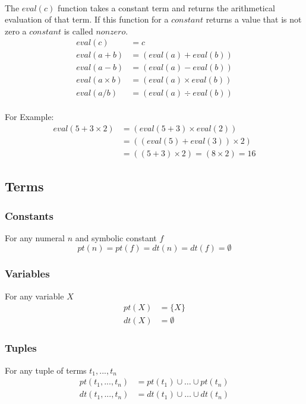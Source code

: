 \documentclass{article}
\newcommand{\set}[1]{\{#1\}}
\begin{document}
	\paragraph{}
	The $\mathit{eval(c)}$ function takes a constant term and returns the arithmetical evaluation of that term. If this function for a $\mathit{constant}$ returns a value that is not zero a $\mathit{constant}$ is called $\mathit{nonzero}$.
	\begin{align*}
		\mathit{eval(c)} &= c \\
		\mathit{eval(a + b)} &= (eval(a) + eval(b)) \\
		\mathit{eval(a - b)} &= (eval(a) - eval(b)) \\
		\mathit{eval(a \times b)} &= (eval(a) \times eval(b)) \\
		\mathit{eval(a / b)} &= (eval(a) \div eval(b))
	\end{align*}
	\\ For Example:
	\begin{align*}
		eval(5 + 3 \times 2) &= (eval(5 + 3) \times eval(2)) \\
		&= ((eval(5) + eval(3)) \times 2) \\
		&= ((5 + 3) \times 2)
		= (8 \times 2)
		= 16
	\end{align*}

	\subsection{Terms}
	\subsubsection{Constants}
	For any numeral $n$ and symbolic constant $f$
	\begin{equation*}
		pt(n) = pt(f) = dt(n) = dt(f) = \emptyset
	\end{equation*}

	\subsubsection{Variables}
	For any variable $X$
	\begin{align*}
		pt(X) &= \set{X} \\
		dt(X) &= \emptyset
	\end{align*}

	\subsubsection{Tuples}
	For any tuple of terms $t_1,...,t_n$
	\begin{align*}
		pt(t_1,...,t_n) &= pt(t_1) \cup \dots \cup pt(t_n) \\
		dt(t_1,...,t_n) &= dt(t_1) \cup \dots \cup dt(t_n)
	\end{align*}
\end{document}
